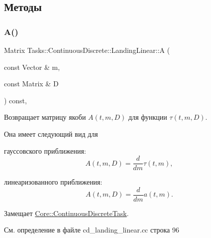 \subsection{Методы}
\hypertarget{class_tasks_1_1_continuous_discrete_1_1_landing_linear_ae584bc7b596882f07b18d2a39dcdfa32}{}\label{class_tasks_1_1_continuous_discrete_1_1_landing_linear_ae584bc7b596882f07b18d2a39dcdfa32} 
\subsubsection{\texorpdfstring{A()}{A()}}
{\footnotesize\ttfamily Matrix Tasks\+::\+Continuous\+Discrete\+::\+Landing\+Linear\+::A (\begin{DoxyParamCaption}\item[{const Vector \&}]{m,  }\item[{const Matrix \&}]{D }\end{DoxyParamCaption}) const\hspace{0.3cm}{\ttfamily [override]}, {\ttfamily [virtual]}}



Возвращает матрицу якоби $A(t, m, D)$ для функции $\tau(t, m, D)$. 

Она имеет следующий вид для


\begin{DoxyItemize}
\item гауссовского приближения\+: \[A(t, m, D) = \frac{d}{dm} \tau(t, m),\]
\item линеаризованного приближения\+: \[A(t, m, D) = \frac{d}{dm} a(t, m).\] 
\end{DoxyItemize}

Замещает \hyperlink{class_core_1_1_continuous_discrete_task_a332d99b61aabb919bffe75d0eec05cfe}{Core\+::\+Continuous\+Discrete\+Task}.



См. определение в файле cd\+\_\+landing\+\_\+linear.\+cc строка 96

\hypertarget{class_tasks_1_1_continuous_discrete_1_1_landing_linear_aa3bddd1de01a202030bbccc1994e10af}{}\label{class_tasks_1_1_continuous_discrete_1_1_landing_linear_aa3bddd1de01a202030bbccc1994e10af} 
